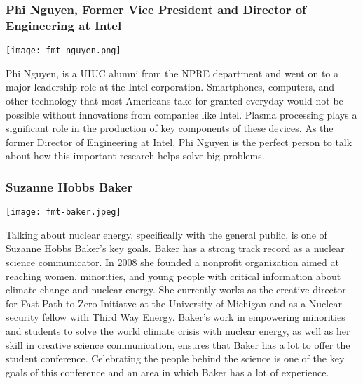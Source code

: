 \subsubsection{Phi Nguyen, Former Vice President and Director of Engineering at Intel}
\begin{minipage}{0.25\textwidth}
	\centering
	\texttt{[image: fmt-nguyen.png]}
\end{minipage}
\begin{minipage}{0.73\textwidth}
Phi Nguyen, is a UIUC alumni from the NPRE department and went on to a major leadership role at the Intel corporation. Smartphones, computers, and other technology that most Americans take for granted everyday would not be possible without innovations from companies like Intel. Plasma processing plays a significant role in the production of key components of these devices. As the former Director of Engineering at Intel, Phi Nguyen is the perfect person to talk about how this important research helps solve big problems. 
	
\end{minipage}

\subsubsection{Suzanne Hobbs Baker}
\begin{minipage}{0.25\textwidth}
	\centering
	\texttt{[image: fmt-baker.jpeg]}
\end{minipage}
\begin{minipage}{0.73\textwidth}
	Talking about nuclear energy, specifically with the general public, is one of Suzanne Hobbs Baker's key goals. Baker has a strong track record as a nuclear science communicator. In 2008 she founded a nonprofit organization aimed at reaching women, minorities, and young people with critical information about climate change and nuclear energy. She currently works as the creative director for Fast Path to Zero Initiatve at the University of Michigan and as a Nuclear security fellow with Third Way Energy. Baker's work in empowering minorities and students to solve the world climate crisis with nuclear energy, as well as her skill in creative science communication, ensures that Baker has a lot to offer the student conference. Celebrating the people behind the science is one of the key goals of this conference and an area in which Baker has a lot of experience.
\end{minipage}

